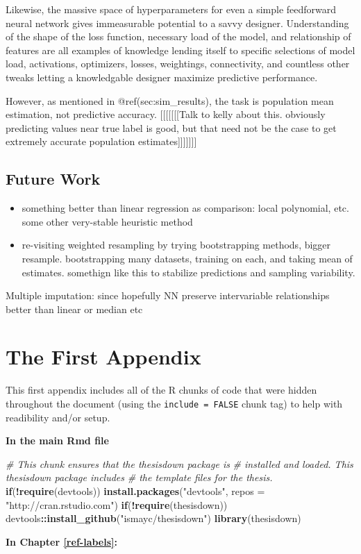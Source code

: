 \documentclass[12pt,twoside]{reedthesis}
\newenvironment{Shaded}{\begin{snugshade}}{\end{snugshade}}
\newcommand{\KeywordTok}[1]{\textcolor[rgb]{0.13,0.29,0.53}{\textbf{#1}}}
\newcommand{\DataTypeTok}[1]{\textcolor[rgb]{0.13,0.29,0.53}{#1}}
\newcommand{\StringTok}[1]{\textcolor[rgb]{0.31,0.60,0.02}{#1}}
\newcommand{\CommentTok}[1]{\textcolor[rgb]{0.56,0.35,0.01}{\textit{#1}}}
\newcommand{\ControlFlowTok}[1]{\textcolor[rgb]{0.13,0.29,0.53}{\textbf{#1}}}
\newcommand{\OperatorTok}[1]{\textcolor[rgb]{0.81,0.36,0.00}{\textbf{#1}}}
\newcommand{\NormalTok}[1]{#1}
\begin{document}
Likewise, the massive space of hyperparameters for even a simple
feedforward neural network gives immeasurable potential to a savvy
designer. Understanding of the shape of the loss function, necessary
load of the model, and relationship of features are all examples of
knowledge lending itself to specific selections of model load,
activations, optimizers, losses, weightings, connectivity, and countless
other tweaks letting a knowledgable designer maximize predictive
performance.

However, as mentioned in @ref(sec:sim\_results), the task is population
mean estimation, not predictive accuracy. {[}{[}{[}{[}{[}{[}{[}Talk to
kelly about this. obviously predicting values near true label is good,
but that need not be the case to get extremely accurate population
estimates{]}{]}{]}{]}{]}{]}{]}

\section{Future Work}\label{future-work}
\begin{itemize}
\item
  something better than linear regression as comparison: local
  polynomial, etc. some other very-stable heuristic method
\item
  re-visiting weighted resampling by trying bootstrapping methods,
  bigger resample. bootstrapping many datasets, training on each, and
  taking mean of estimates. somethign like this to stabilize predictions
  and sampling variability.
\end{itemize}
Multiple imputation: since hopefully NN preserve intervariable
relationships better than linear or median etc

\appendix

\chapter{The First Appendix}\label{the-first-appendix}

This first appendix includes all of the R chunks of code that were
hidden throughout the document (using the \texttt{include\ =\ FALSE}
chunk tag) to help with readibility and/or setup.

\textbf{In the main Rmd file}
\begin{Shaded}
\begin{Highlighting}[]
\CommentTok{# This chunk ensures that the thesisdown package is}
\CommentTok{# installed and loaded. This thesisdown package includes}
\CommentTok{# the template files for the thesis.}
\ControlFlowTok{if}\NormalTok{(}\OperatorTok{!}\KeywordTok{require}\NormalTok{(devtools))}
  \KeywordTok{install.packages}\NormalTok{(}\StringTok{"devtools"}\NormalTok{, }\DataTypeTok{repos =} \StringTok{"http://cran.rstudio.com"}\NormalTok{)}
\ControlFlowTok{if}\NormalTok{(}\OperatorTok{!}\KeywordTok{require}\NormalTok{(thesisdown))}
\NormalTok{  devtools}\OperatorTok{::}\KeywordTok{install_github}\NormalTok{(}\StringTok{"ismayc/thesisdown"}\NormalTok{)}
\KeywordTok{library}\NormalTok{(thesisdown)}
\end{Highlighting}
\end{Shaded}
\textbf{In Chapter \ref{ref-labels}:}
\end{document}

